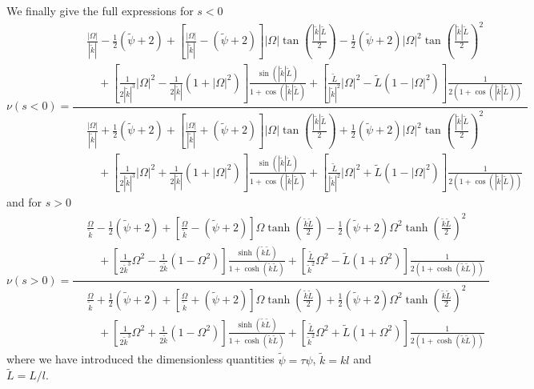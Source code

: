 \documentclass[pre,aps,superscriptaddress,nofootinbib]{revtex4}
\begin{document}
We finally give the full expressions for $s < 0$
\begin{equation}
\nu(s < 0) = \frac{
\begin{aligned}
&\frac{|\Omega|}{|\tilde{k}|} - \frac{1}{2}(\tilde{\psi} + 2) + \left[\frac{|\Omega|}{|\tilde{k}|} - (\tilde{\psi} + 2)\right] |\Omega| \tan\left(\frac{|\tilde{k}| \tilde{L}}{2}\right) - \frac{1}{2} (\tilde{\psi} + 2)|\Omega|^2 \tan\left(\frac{|\tilde{k}| \tilde{L}}{2}\right)^2\\
&\quad+ \left[\frac{1}{2 |\tilde{k}|^3} |\Omega|^2 - \frac{1}{2|\tilde{k}|}(1 + |\Omega|^2)\right] \frac{\sin(|\tilde{k}|\tilde{L})}{1 + \cos(|\tilde{k}| \tilde{L})} + \left[\frac{\tilde{L}}{|\tilde{k}|^2}|\Omega|^2 - \tilde{L}(1 - |\Omega|^2)\right]\frac{1}{2(1 + \cos(|\tilde{k}| \tilde{L}))}
\end{aligned}
}{
\begin{aligned}
&\frac{|\Omega|}{|\tilde{k}|} + \frac{1}{2}(\tilde{\psi} + 2) + \left[\frac{|\Omega|}{|\tilde{k}|} + (\tilde{\psi} + 2)\right] |\Omega| \tan\left(\frac{|\tilde{k}| \tilde{L}}{2}\right) + \frac{1}{2} (\tilde{\psi} + 2)|\Omega|^2 \tan\left(\frac{|\tilde{k}| \tilde{L}}{2}\right)^2\\
&\quad+ \left[\frac{1}{2 |\tilde{k}|^3} |\Omega|^2 + \frac{1}{2|\tilde{k}|}(1 + |\Omega|^2)\right] \frac{\sin(|\tilde{k}|\tilde{L})}{1 + \cos(|\tilde{k}| \tilde{L})} + \left[\frac{\tilde{L}}{|\tilde{k}|^2}|\Omega|^2 + \tilde{L}(1 - |\Omega|^2)\right]\frac{1}{2(1 + \cos(|\tilde{k}| \tilde{L}))}
\end{aligned}
}
\end{equation}
and for $s > 0$
\begin{equation}
\nu(s > 0) = \frac{
\begin{aligned}
&\frac{\Omega}{\tilde{k}} - \frac{1}{2}(\tilde{\psi} + 2) + \left[\frac{\Omega}{\tilde{k}} - (\tilde{\psi} + 2)\right] \Omega \tanh\left(\frac{\tilde{k} \tilde{L}}{2}\right) - \frac{1}{2} (\tilde{\psi} + 2)\Omega^2 \tanh\left(\frac{\tilde{k} \tilde{L}}{2}\right)^2\\
&\quad+ \left[\frac{1}{2 \tilde{k}^3} \Omega^2 - \frac{1}{2\tilde{k}}(1 - \Omega^2)\right] \frac{\sinh(\tilde{k}\tilde{L})}{1 + \cosh(\tilde{k} \tilde{L})} + \left[\frac{\tilde{L}}{\tilde{k}^2}\Omega^2 - \tilde{L}(1 + \Omega^2)\right]\frac{1}{2(1 + \cosh(\tilde{k} \tilde{L}))}
\end{aligned}
}{
\begin{aligned}
&\frac{\Omega}{\tilde{k}} + \frac{1}{2}(\tilde{\psi} + 2) + \left[\frac{\Omega}{\tilde{k}} + (\tilde{\psi} + 2)\right] \Omega \tanh\left(\frac{\tilde{k} \tilde{L}}{2}\right) + \frac{1}{2} (\tilde{\psi} + 2)\Omega^2 \tanh\left(\frac{\tilde{k} \tilde{L}}{2}\right)^2\\
&\quad+ \left[\frac{1}{2 \tilde{k}^3} \Omega^2 + \frac{1}{2\tilde{k}}(1 - \Omega^2)\right] \frac{\sinh(\tilde{k}\tilde{L})}{1 + \cosh(\tilde{k} \tilde{L})} + \left[\frac{\tilde{L}}{\tilde{k}^2}\Omega^2 + \tilde{L}(1 + \Omega^2)\right]\frac{1}{2(1 + \cosh(\tilde{k} \tilde{L}))}
\end{aligned}
}
\end{equation}
where we have introduced the dimensionless quantities $\tilde{\psi} = \tau \psi$, $\tilde{k} = k l$ and $\tilde{L} = L/l$.
\end{document}
